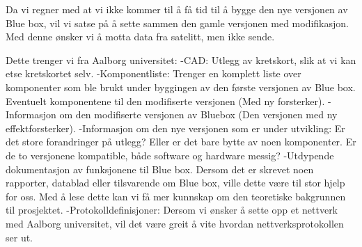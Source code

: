 Da vi regner med at vi ikke kommer til å få tid til å bygge den nye versjonen av Blue box, vil vi satse på å sette sammen den gamle versjonen med modifikasjon. Med denne ønsker vi å motta data fra satelitt, men ikke sende. 

Dette trenger vi fra Aalborg universitet:
-CAD: Utlegg av kretskort, slik at vi kan etse kretskortet selv.
-Komponentliste: Trenger en komplett liste over komponenter som ble brukt under byggingen av den første versjonen av Blue box. Eventuelt komponentene til den modifiserte versjonen (Med ny forsterker). 
-Informasjon om den modifiserte versjonen av Bluebox (Den versjonen med ny effektforsterker).
-Informasjon om den nye versjonen som er under utvikling: Er det store forandringer på utlegg? Eller er det bare bytte av noen komponenter. Er de to versjonene kompatible, både software og hardware messig?
-Utdypende dokumentasjon av funksjonene til Blue box. Dersom det er skrevet noen rapporter, datablad eller tilsvarende om Blue box, ville dette være til stor hjelp for oss. Med å lese dette kan vi få mer kunnskap om den teoretiske bakgrunnen til prosjektet. 
-Protokolldefinisjoner: Dersom vi ønsker å sette opp et nettverk med Aalborg universitet, vil det være greit å vite hvordan nettverksprotokollen ser ut. 
